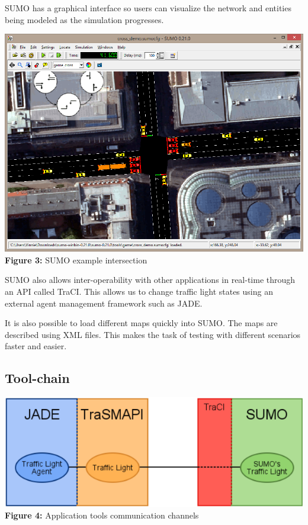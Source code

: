 \documentclass[10pt,a4paper]{article}
\begin{document}
    SUMO has a graphical interface so users can visualize the network and entities being modeled as the simulation progresses.     
    
\begin{center}
    \includegraphics[width=1.0\textwidth]{sumo.PNG}
    \textbf{Figure 3:} SUMO example intersection
\end{center}    
    
    SUMO also allows inter-operability with other applications in real-time through an API called TraCI. This allows us to change traffic light states using an external agent management framework such as JADE.
    
    It is also possible to load different maps quickly into SUMO. The maps are described using XML files. This makes the task of testing with different scenarios faster and easier.
   
\subsection{Tool-chain}
    
\begin{center}
    \includegraphics[width=1.0\textwidth]{toolchain.PNG}
    \textbf{Figure 4:} Application tools communication channels
\end{center}
\end{document}
